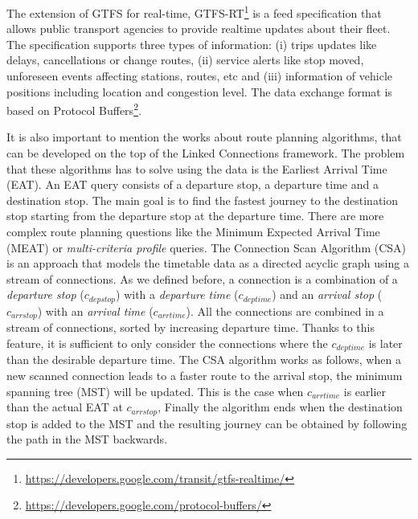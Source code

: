\documentclass[sw]{iosart2x}
\begin{document}
The extension of GTFS for real-time, GTFS-RT\footnote{\url{https://developers.google.com/transit/gtfs-realtime/}} is a feed specification that allows public transport agencies to provide realtime updates about their fleet. The specification supports three types of information: (i) trips updates like delays, cancellations or change routes, (ii) service alerts like stop moved, unforeseen events affecting stations, routes, etc and (iii)  information of vehicle positions  including location and congestion level. The data exchange format is based on Protocol Buffers\footnote{\url{https://developers.google.com/protocol-buffers/}}.

It is also important to mention the works about route planning algorithms, that can be developed on the top of the Linked Connections framework. The problem that these algorithms has to solve using the data is the Earliest Arrival Time (EAT). An EAT query consists of a departure stop, a departure time and a destination stop. The main goal is to find the fastest journey to the destination stop starting from the departure stop at the departure time. There are more complex route planning questions like the Minimum Expected Arrival Time (MEAT)\cite{dibbelt2013intriguingly} or \textit{multi-criteria profile} queries\cite{bast2010fast,delling2014round,witt2015trip}. The Connection Scan Algorithm (CSA) \cite{dibbelt2013intriguingly} is an approach that models the timetable data as a directed acyclic graph \cite{strasser2014connection} using a stream of connections. As we defined before, a connection is a combination of a \textit{departure stop} ($c_{depstop}$) with a \textit{departure time} ($c_{deptime}$) and an \textit{arrival stop} ($c_{arrstop}$) with an \textit{arrival time} ($c_{arrtime}$). All the connections are combined in a stream of connections, sorted by increasing departure time. Thanks to this feature, it is sufficient to only consider the connections where the $c_{deptime}$ is later than the desirable departure time. The CSA algorithm works as follows, when a new scanned connection leads to a faster route to the arrival stop, the minimum spanning tree (MST) will be updated. This is the case when $c_{arrtime}$ is earlier than the actual EAT at $c_{arrstop}$, Finally the algorithm ends when the destination stop is added to the MST and the resulting journey can be obtained by following the path in the MST backwards.
\end{document}

